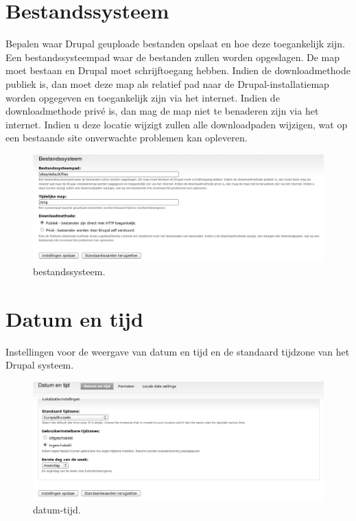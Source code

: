 \section{Bestandssysteem} 
    Bepalen waar Drupal geuploade bestanden opslaat en hoe deze toegankelijk
    zijn. Een bestandssysteempad waar de bestanden zullen worden opgeslagen. De
    map moet bestaan en Drupal moet schrijftoegang hebben. Indien de downloadmethode publiek 
    is, dan moet deze map als relatief pad naar de Drupal-installatiemap worden opgegeven en 
    toegankelijk zijn via het internet. Indien de downloadmethode priv\'e is,
    dan mag de map niet te benaderen zijn via het internet. Indien u deze locatie wijzigt zullen alle downloadpaden wijzigen, 
    wat op een bestaande site onverwachte problemen kan opleveren.
 \begin{figure}[!h]
    \centering
   \includegraphics[scale=0.3,angle=0]{bestandssysteem}
   \caption{bestandssysteem.\label{white}}
 \end{figure}   
    
    
\section{Datum  en tijd } 
    Instellingen voor de weergave van datum en tijd en de standaard tijdzone van het Drupal systeem.
\begin{figure}[!h]
    \centering
   \includegraphics[scale=0.3,angle=0]{datum-tijd}
   \caption{datum-tijd.\label{white}}
 \end{figure}      
    
